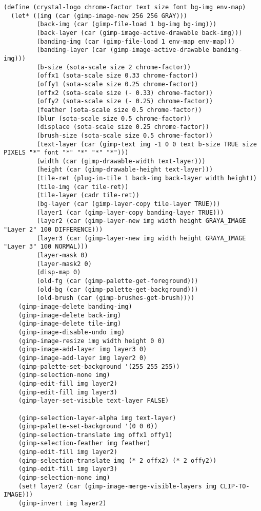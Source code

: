 \documentclass{article}
\begin{document}
{\begin{verbatim}
(define (crystal-logo chrome-factor text size font bg-img env-map)
  (let* ((img (car (gimp-image-new 256 256 GRAY)))
         (back-img (car (gimp-file-load 1 bg-img bg-img)))
         (back-layer (car (gimp-image-active-drawable back-img)))
         (banding-img (car (gimp-file-load 1 env-map env-map)))
         (banding-layer (car (gimp-image-active-drawable banding-img)))
         (b-size (sota-scale size 2 chrome-factor))
         (offx1 (sota-scale size 0.33 chrome-factor))
         (offy1 (sota-scale size 0.25 chrome-factor))
         (offx2 (sota-scale size (- 0.33) chrome-factor))
         (offy2 (sota-scale size (- 0.25) chrome-factor))
         (feather (sota-scale size 0.5 chrome-factor))
         (blur (sota-scale size 0.5 chrome-factor))
         (displace (sota-scale size 0.25 chrome-factor))
         (brush-size (sota-scale size 0.5 chrome-factor))
         (text-layer (car (gimp-text img -1 0 0 text b-size TRUE size PIXELS "*" font "*" "*" "*" "*")))
         (width (car (gimp-drawable-width text-layer)))
         (height (car (gimp-drawable-height text-layer)))
         (tile-ret (plug-in-tile 1 back-img back-layer width height))
         (tile-img (car tile-ret))
         (tile-layer (cadr tile-ret))
         (bg-layer (car (gimp-layer-copy tile-layer TRUE)))
         (layer1 (car (gimp-layer-copy banding-layer TRUE)))
         (layer2 (car (gimp-layer-new img width height GRAYA_IMAGE "Layer 2" 100 DIFFERENCE)))
         (layer3 (car (gimp-layer-new img width height GRAYA_IMAGE "Layer 3" 100 NORMAL)))
         (layer-mask 0)
         (layer-mask2 0)
         (disp-map 0)
         (old-fg (car (gimp-palette-get-foreground)))
         (old-bg (car (gimp-palette-get-background)))
         (old-brush (car (gimp-brushes-get-brush))))
    (gimp-image-delete banding-img)
    (gimp-image-delete back-img)
    (gimp-image-delete tile-img)
    (gimp-image-disable-undo img)
    (gimp-image-resize img width height 0 0)
    (gimp-image-add-layer img layer3 0)
    (gimp-image-add-layer img layer2 0)
    (gimp-palette-set-background '(255 255 255))
    (gimp-selection-none img)
    (gimp-edit-fill img layer2)
    (gimp-edit-fill img layer3)
    (gimp-layer-set-visible text-layer FALSE)

    (gimp-selection-layer-alpha img text-layer)
    (gimp-palette-set-background '(0 0 0))
    (gimp-selection-translate img offx1 offy1)
    (gimp-selection-feather img feather)
    (gimp-edit-fill img layer2)
    (gimp-selection-translate img (* 2 offx2) (* 2 offy2))
    (gimp-edit-fill img layer3)
    (gimp-selection-none img)
    (set! layer2 (car (gimp-image-merge-visible-layers img CLIP-TO-IMAGE)))
    (gimp-invert img layer2)


\end{verbatim}}
\end{document}
